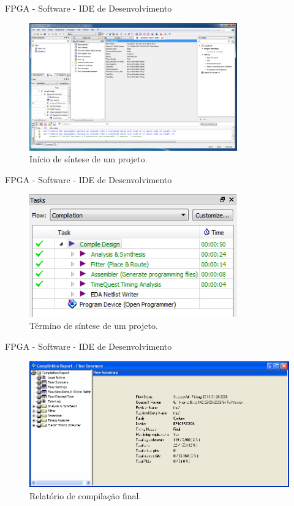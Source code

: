 	\begin{frame}{FPGA - Software - IDE de Desenvolvimento}
		\begin{figure}[p]
			\centering
			\includegraphics[width=0.8\textwidth]{img/fpga/software_quartus_compilation0.png}
			\caption{Início de síntese de um projeto.}
			\label{fig:alteraquartus_comp0}
		\end{figure}
	\end{frame}

	\begin{frame}{FPGA - Software - IDE de Desenvolvimento}
		\begin{figure}[p]
			\centering
			\includegraphics[width=0.8\textwidth]{img/fpga/software_quartus_compilation1.png}
			\caption{Término de síntese de um projeto.}
			\label{fig:alteraquartus_comp1}
		\end{figure}
	\end{frame}

	\begin{frame}{FPGA - Software - IDE de Desenvolvimento}
		\begin{figure}[p]
			\centering
			\includegraphics[width=1\textwidth]{img/fpga/software_quartus_compilation2.png}
			\caption{Relatório de compilação final.}
			\label{fig:alteraquartus_comp2}
		\end{figure}
	\end{frame}

